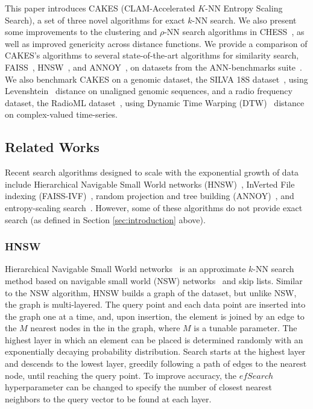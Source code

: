This paper introduces CAKES (CLAM-Accelerated $K$-NN Entropy Scaling Search), a set of three novel algorithms for exact $k$-NN search.
We also present some improvements to the clustering and $\rho$-NN search algorithms in CHESS~\cite{ishaq2019clustered}, as well as improved genericity across distance functions.
We provide a comparison of CAKES's algorithms to several state-of-the-art algorithms for similarity search, FAISS~\cite{johnson2019billion}, HNSW~\cite{malkov2016hnsw}, and ANNOY~\cite{annoy}, on datasets from the ANN-benchmarks suite~\cite{aumuller2020ann}.
We also benchmark CAKES on a genomic dataset, the SILVA 18S dataset~\cite{10.1093/nar/gks1219}, using Levenshtein~\cite{levenshtein1966binary} distance on unaligned genomic sequences, and a radio frequency dataset, the RadioML dataset~\cite{oshea2018radioml}, using Dynamic Time Warping (DTW)~\cite{gold2018dynamic} distance on complex-valued time-series.


\subsection{Related Works}
\label{sec:intoduction:related-works}

Recent search algorithms designed to scale with the exponential growth of data include Hierarchical Navigable Small World networks (HNSW)~\cite{Malkov2016EfficientAR}, InVerted File indexing (FAISS-IVF)~\cite{faissivf}, random projection and tree building (ANNOY)~\cite{annoy}, and entropy-scaling search~\cite{yu2015entropy, ishaq2019clustered}. However, some of these algorithms do not provide exact search (as defined in Section \ref{sec:introduction} above).


\subsubsection{HNSW}
\label{sec:introduction:related-works:hnsw}

Hierarchical Navigable Small World networks~\cite{Malkov2016EfficientAR} is an approximate $k$-NN search method based on navigable small world (NSW) networks~\cite{kleinberg2000navigation, boguna2009navigability} and skip lists. 
Similar to the NSW algorithm, HNSW builds a graph of the dataset, but unlike NSW, the graph is multi-layered.
The query point and each data point are inserted into the graph one at a time, and, upon insertion, the element is joined by an edge to the $M$ nearest nodes in the in the graph, where $M$ is a tunable parameter. 
The highest layer in which an element can be placed is determined randomly with an exponentially decaying probability distribution.
Search starts at the highest layer and descends to the lowest layer, greedily following a path of edges to the nearest node, until reaching the query point. 
To improve accuracy, the $efSearch$ hyperparameter can be changed to specify the number of closest nearest neighbors to the query vector to be found at each layer. 


